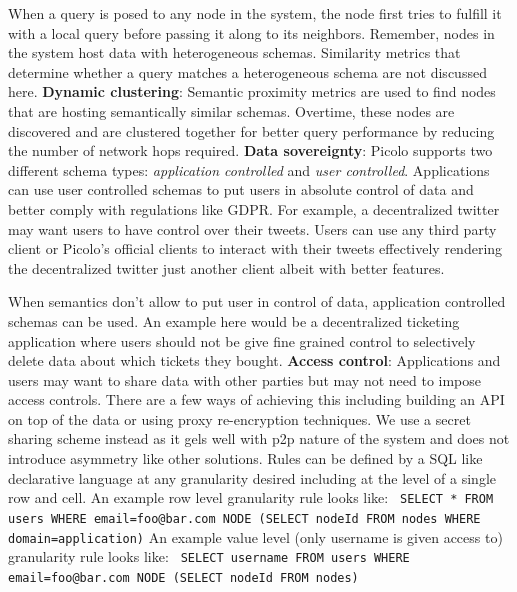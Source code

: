 \documentclass[preprint,12pt]{elsarticle}
\begin{document}
When a query is posed to any node in the system, the node first tries to fulfill it with a local query before passing it along to its neighbors. Remember, nodes in the system host data with heterogeneous schemas. Similarity metrics that determine whether a query matches a heterogeneous schema are not discussed here.
\newline
\newline
\textbf{Dynamic clustering}:
Semantic proximity metrics are used to find nodes that are hosting semantically similar schemas. Overtime, these nodes are discovered and are clustered together for better query performance by reducing the number of network hops required.
\newline
\newline
\textbf{Data sovereignty}: 
Picolo supports two different schema types: \textit{application controlled} and \textit{user controlled}. Applications can use user controlled schemas to put users in absolute control of data and better comply with regulations like GDPR. For example, a decentralized twitter may  want users to have control over their tweets. Users can use any third party client or Picolo's official clients to interact with their tweets effectively rendering the decentralized twitter just another client albeit with better features.

When semantics don't allow to put user in control of data, application controlled schemas can be used. An example here would be a decentralized ticketing application where users should not be give fine grained control to selectively delete data about which tickets they bought.
\newline
\newline
\textbf{Access control}:
Applications and users may want to share data with other parties but may not need to impose access controls. There are a few ways of achieving this including building an API on top of the data or using proxy re-encryption techniques. We use a secret sharing scheme instead as it gels well with p2p nature of the system and does not introduce asymmetry like other solutions. Rules can be defined by a SQL like declarative language at any granularity desired including at the level of a single row and cell. An example row level granularity rule looks like:\newline \newline
\texttt{ SELECT  * \newline FROM users \newline WHERE email=foo@bar.com \newline NODE (SELECT nodeId FROM nodes WHERE domain=application)} \newline \newline
An example value level (only username is given access to) granularity rule looks like:\newline \newline
\texttt{ SELECT username \newline FROM users \newline WHERE email=foo@bar.com \newline NODE (SELECT nodeId FROM nodes)}
\end{document}
